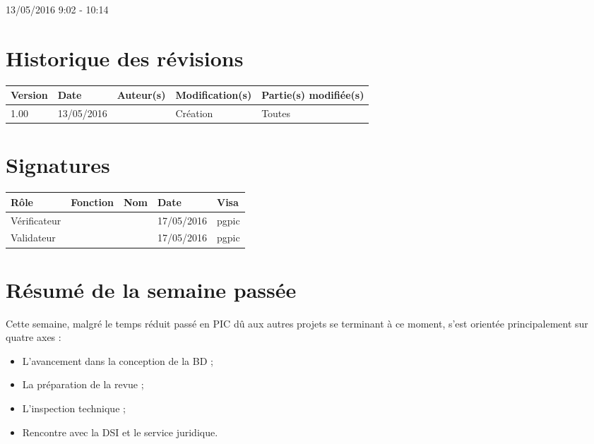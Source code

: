 \documentclass [a4paper] {article}
\begin{document}
13/05/2016			 				%
\hfill   
\hfill 	 9:02 - 10:14				%


\section*{Historique des révisions}
\begin{center}
			\begin{tabular}{| p{2.5cm} | p{3cm} | p{3cm} | p{3cm} | p{3.5cm} |}
				\hline
				\rowcolor{Gray}
				Version & Date & Auteur(s) & Modification(s) & Partie(s) modifiée(s)		 \\
				\hline
				1.00 & 13/05/2016 & \Pierre & Création & Toutes \\
		\hline		
			\end{tabular}
		\end{center}

\section*{Signatures}

		\begin{center}
			\begin{tabular}{| p{2.5cm} | p{4cm} | p{3cm} | p{3cm} | p{2.5cm} |}
				\hline
				\rowcolor{Gray}
				Rôle & Fonction & Nom & Date & Visa		 \\
				\hline
				Vérificateur & \RQA & \Kafui & 17/05/2016 & pgpic \\[30pt]
				\hline
				Validateur & \CP & \Sergi & 17/05/2016 & pgpic \\[30pt]	
				\hline
			\end{tabular}
		\end{center}


\section{Résumé de la semaine passée}
Cette semaine, malgré le temps réduit passé en PIC dû aux autres projets se terminant à ce moment, s'est orientée principalement sur quatre axes : 
\begin{itemize}
\item L'avancement dans la conception de la BD ;
\item La préparation de la revue ;
\item L'inspection technique ;
\item Rencontre avec la DSI et le service juridique.
\end{itemize} 
\end{document}
